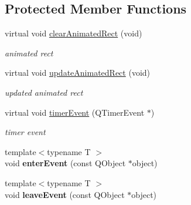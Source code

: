 \subsection*{Protected Member Functions}
\begin{DoxyCompactItemize}
\item 
\mbox{\label{class_menu_bar_data_v2_ad4432bef47585b4267d135fcceb975d8}} 
virtual void \hyperlink{class_menu_bar_data_v2_ad4432bef47585b4267d135fcceb975d8}{clear\+Animated\+Rect} (void)
\begin{DoxyCompactList}\small\item\em animated rect \end{DoxyCompactList}\item 
\mbox{\label{class_menu_bar_data_v2_ab82d66c8e1675e99cfeb5d67d1641bd8}} 
virtual void \hyperlink{class_menu_bar_data_v2_ab82d66c8e1675e99cfeb5d67d1641bd8}{update\+Animated\+Rect} (void)
\begin{DoxyCompactList}\small\item\em updated animated rect \end{DoxyCompactList}\item 
\mbox{\label{class_menu_bar_data_v2_ac96a32d273694bc99035d53988ec0765}} 
virtual void \hyperlink{class_menu_bar_data_v2_ac96a32d273694bc99035d53988ec0765}{timer\+Event} (Q\+Timer\+Event $\ast$)
\begin{DoxyCompactList}\small\item\em timer event \end{DoxyCompactList}\item 
\mbox{\label{class_menu_bar_data_v2_a473862da55537df9eb8e819b6d4494b1}} 
{\footnotesize template$<$typename T $>$ }\\void {\bfseries enter\+Event} (const Q\+Object $\ast$object)
\item 
\mbox{\label{class_menu_bar_data_v2_a152bd3b5781dea36c52ee5073d1fc496}} 
{\footnotesize template$<$typename T $>$ }\\void {\bfseries leave\+Event} (const Q\+Object $\ast$object)
\item 
\mbox{\label{class_menu_bar_data_v2_a4d65a7aaea20646d5f5afc410e258681}} 

\end{DoxyCompactItemize}
